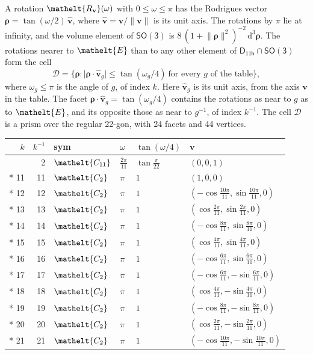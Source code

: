 \documentclass[10pt,a4paper]{article}
\numberwithin{equation}{section}
\newcommand{\eltfont}[1]{{\let\sigma\eltsigma\mathelt{#1}}}
\newcommand{\grp}[1]{\mathsf{#1}}
\newcommand{\cls}[1]{\eltfont{#1}}
\newcommand{\elt}[1]{\eltfont{#1}}
\newcommand{\dirvec}[3]{(#1, #2, #3)}
\newcommand{\unitaxis}{\hat{\mathbf{v}}}
\newcommand{\vv}{\mathbf{v}}
\newcommand{\diff}{\mathrm{d}}
\newcommand{\rodrigues}{\boldsymbol{\rho}}
\newcommand{\fcell}{\mathcal{D}}
\begin{document}
\leavevmode\label{n:vector.rodrigues}\label{n:vector.unitaxis}A rotation $\elt{R_{\vv}}(\omega)$ with $0 \le \omega \le \pi$ has the Rodrigues vector $\rodrigues = \tan(\omega/2)\,\unitaxis$, where $\unitaxis = \vv/\lVert\vv\rVert$ is its unit axis. The rotations by $\pi$ lie at infinity, and the volume element of \href{SO3.pdf}{$\grp{SO(3)}$} is $8\,(1 + \lVert\rodrigues\rVert^2)^{-2}\,\diff^3\rodrigues$.
\leavevmode\label{n:set.cell}The rotations nearer to $\elt{E}$ than to any other element of $\grp{D_{11h}} \cap \grp{SO(3)}$ form the cell
\begin{equation}\label{e:cell}\fcell = \bigl\{\rodrigues : \lvert\rodrigues\cdot\unitaxis_g\rvert \le \tan(\omega_g/4)\ \text{for every $g$ of the table}\bigr\},\end{equation}
where $\omega_g \le \pi$ is the angle of $g$, of index $k$. Here $\unitaxis_g$ is its unit axis, from the axis $\vv$ in the table. The facet $\rodrigues\cdot\unitaxis_g = \tan(\omega_g/4)$ contains the rotations as near to $g$ as to $\elt{E}$, and its opposite those as near to $g^{-1}$, of index $k^{-1}$. The cell $\fcell$ is a prism over the regular 22-gon, with 24 facets and 44 vertices.
{\small{\renewcommand{\arraystretch}{1.3}\begin{longtable}{@{}rrllll@{}}\toprule
$k$ & $k^{-1}$ & sym & $\omega$ & $\tan(\omega/4)$ & $\vv$\\\midrule\endhead
\bottomrule\endfoot\endlastfoot
1 & 2 & $\cls{C_{11}}$ & $\tfrac{2\pi}{11}$ & $\tan\tfrac{\pi}{22}$ & $\dirvec{0}{0}{1}$\\*
11 & 11 & $\cls{C_{2}}$ & $\pi$ & $1$ & $\dirvec{1}{0}{0}$\\*
12 & 12 & $\cls{C_{2}}$ & $\pi$ & $1$ & $\dirvec{-\cos\tfrac{10\pi}{11}}{\sin\tfrac{10\pi}{11}}{0}$\\*
13 & 13 & $\cls{C_{2}}$ & $\pi$ & $1$ & $\dirvec{\cos\tfrac{2\pi}{11}}{\sin\tfrac{2\pi}{11}}{0}$\\*
14 & 14 & $\cls{C_{2}}$ & $\pi$ & $1$ & $\dirvec{-\cos\tfrac{8\pi}{11}}{\sin\tfrac{8\pi}{11}}{0}$\\*
15 & 15 & $\cls{C_{2}}$ & $\pi$ & $1$ & $\dirvec{\cos\tfrac{4\pi}{11}}{\sin\tfrac{4\pi}{11}}{0}$\\*
16 & 16 & $\cls{C_{2}}$ & $\pi$ & $1$ & $\dirvec{-\cos\tfrac{6\pi}{11}}{\sin\tfrac{6\pi}{11}}{0}$\\*
17 & 17 & $\cls{C_{2}}$ & $\pi$ & $1$ & $\dirvec{-\cos\tfrac{6\pi}{11}}{-\sin\tfrac{6\pi}{11}}{0}$\\*
18 & 18 & $\cls{C_{2}}$ & $\pi$ & $1$ & $\dirvec{\cos\tfrac{4\pi}{11}}{-\sin\tfrac{4\pi}{11}}{0}$\\*
19 & 19 & $\cls{C_{2}}$ & $\pi$ & $1$ & $\dirvec{-\cos\tfrac{8\pi}{11}}{-\sin\tfrac{8\pi}{11}}{0}$\\*
20 & 20 & $\cls{C_{2}}$ & $\pi$ & $1$ & $\dirvec{\cos\tfrac{2\pi}{11}}{-\sin\tfrac{2\pi}{11}}{0}$\\*
21 & 21 & $\cls{C_{2}}$ & $\pi$ & $1$ & $\dirvec{-\cos\tfrac{10\pi}{11}}{-\sin\tfrac{10\pi}{11}}{0}$\\
\bottomrule\end{longtable}}}
\end{document}
